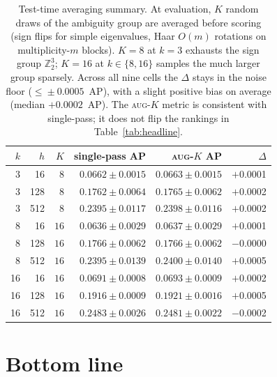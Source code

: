 \documentclass[11pt]{article}
\begin{document}
\begin{table}[h]
\centering\small
\setlength{\tabcolsep}{6pt}
\begin{tabular}{r r r r r r}
\toprule
$k$ & $h$  & $K$  & single-pass AP                & \textsc{aug-$K$} AP             & $\Delta$ \\
\midrule
 3  &  16  &  $8$ & $0.0662 \pm 0.0015$           & $0.0663 \pm 0.0015$             & $+$0.0001 \\
 3  & 128  &  $8$ & $0.1762 \pm 0.0064$           & $0.1765 \pm 0.0062$             & $+$0.0002 \\
 3  & 512  &  $8$ & $0.2395 \pm 0.0117$           & $0.2398 \pm 0.0116$             & $+$0.0002 \\
\midrule
 8  &  16  & $16$ & $0.0636 \pm 0.0029$           & $0.0637 \pm 0.0029$             & $+$0.0001 \\
 8  & 128  & $16$ & $0.1766 \pm 0.0062$           & $0.1766 \pm 0.0062$             & $-$0.0000 \\
 8  & 512  & $16$ & $0.2395 \pm 0.0139$           & $0.2400 \pm 0.0140$             & $+$0.0005 \\
\midrule
16  &  16  & $16$ & $0.0691 \pm 0.0008$           & $0.0693 \pm 0.0009$             & $+$0.0002 \\
16  & 128  & $16$ & $0.1916 \pm 0.0009$           & $0.1921 \pm 0.0016$             & $+$0.0005 \\
16  & 512  & $16$ & $0.2483 \pm 0.0026$           & $0.2481 \pm 0.0022$             & $-$0.0002 \\
\bottomrule
\end{tabular}
\caption{Test-time averaging summary. At evaluation, $K$ random draws of
the ambiguity group are averaged before scoring (sign flips for simple
eigenvalues, Haar $O(m)$ rotations on multiplicity-$m$ blocks).
$K\!=\!8$ at $k\!=\!3$ exhausts the sign group $\mathbb{Z}_2^3$;
$K\!=\!16$ at $k\!\in\!\{8,16\}$ samples the much larger group sparsely.
Across all nine cells the $\Delta$ stays in the noise floor
($\le\!\pm 0.0005$~AP), with a slight positive bias on average
(median $+0.0002$~AP). The \textsc{aug-$K$} metric is consistent with
single-pass; it does not flip the rankings in
Table~\ref{tab:headline}.}
\label{tab:augk}
\end{table}

\section{Bottom line}
\end{document}
